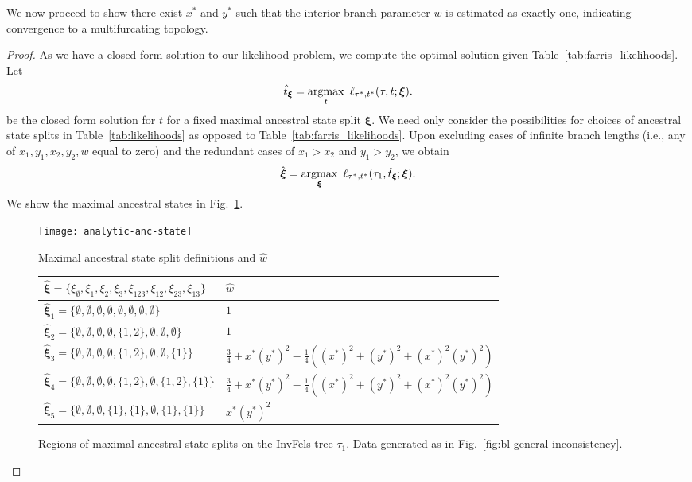 We now proceed to show there exist $x^*$ and $y^*$ such that the interior branch parameter $w$ is estimated as exactly one, indicating convergence to a multifurcating topology.

\topoInconsist*

\begin{proof}
As we have a closed form solution to our likelihood problem, we compute the optimal solution given Table~\ref{tab:farris_likelihoods}.
Let
\[
\hat{t}_{\boldsymbol\xi} = \operatorname*{argmax}_{t} \ \ell_{\tau^*,t^*}(\tau, t; \boldsymbol\xi).
\]
be the closed form solution for $t$ for a fixed maximal ancestral state split $\boldsymbol\xi$.
We need only consider the possibilities for choices of ancestral state splits in Table~\ref{tab:likelihoods} as opposed to Table~\ref{tab:farris_likelihoods}.
Upon excluding cases of infinite branch lengths (i.e., any of $x_1,y_1,x_2,y_2,w$ equal to zero) and the redundant cases of $x_1 > x_2$ and $y_1 > y_2$, we obtain
\[
\hat{\boldsymbol\xi} =
    \operatorname*{argmax}_{\boldsymbol\xi} \ \ell_{\tau^*,t^*}(\tau_1, \hat{t}_{\boldsymbol\xi}; \boldsymbol\xi).
\]
We show the maximal ancestral states in Fig.~\ref{fig:max-anc-state}.

\begin{figure}
    \begin{minipage}{\linewidth}
        \centering
        \texttt{[image: analytic-anc-state]}
        \label{ }
    \end{minipage}
    \begin{minipage}{\linewidth}
        \centering
        Maximal ancestral state split definitions and $\hat{w}$
        \begin{tabular}{ll}
        \hline
        $\hat{\boldsymbol\xi} = \{\xi_{\emptyset},\xi_{1},\xi_{2},\xi_{3},\xi_{123},\xi_{12},\xi_{23},\xi_{13}\}$ & $\hat{w}$\\
        \hline
        $\hat{\boldsymbol\xi}_1 = \{\emptyset,\emptyset,\emptyset,\emptyset,\emptyset,\emptyset,\emptyset,\emptyset\}$ & $1$\\
        $\hat{\boldsymbol\xi}_2 = \{\emptyset,\emptyset,\emptyset,\emptyset,\{1,2\},\emptyset,\emptyset,\emptyset\}$ & $1$\\
        $\hat{\boldsymbol\xi}_3 = \{\emptyset,\emptyset,\emptyset,\emptyset,\{1,2\},\emptyset,\emptyset,\{1\}\}$ & $\frac{3}{4}+x^*(y^*)^2-\frac{1}{4}((x^*)^2+(y^*)^2+(x^*)^2(y^*)^2)$\\
        $\hat{\boldsymbol\xi}_4 = \{\emptyset,\emptyset,\emptyset,\emptyset,\{1,2\},\emptyset,\{1,2\},\{1\}\}$ & $\frac{3}{4}+x^*(y^*)^2-\frac{1}{4}((x^*)^2+(y^*)^2+(x^*)^2(y^*)^2)$\\
        $\hat{\boldsymbol\xi}_5 = \{\emptyset,\emptyset,\emptyset,\{1\},\{1\},\emptyset,\{1\},\{1\}\}$ & $x^*(y^*)^2$\\
        \hline
        \end{tabular}
    \end{minipage}
\caption{
Regions of maximal ancestral state splits on the InvFels tree $\tau_1$.
Data generated as in Fig.~\ref{fig:bl-general-inconsistency}.
}
\label{fig:max-anc-state}
\end{figure}


\end{proof}
